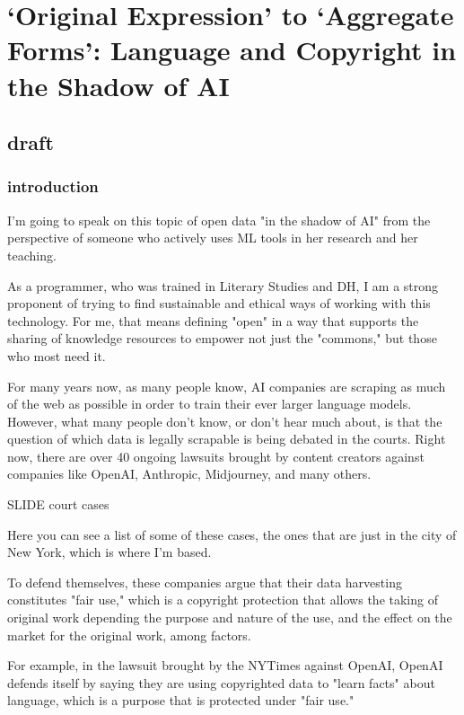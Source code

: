 \documentclass[11pt]{article}
\author{fcalado}
\date{\today}
\title{}
\begin{document}
\tableofcontents

\section{‘Original Expression’ to ‘Aggregate Forms’: Language and Copyright in the Shadow of AI}
\label{sec:org4a910bb}

\subsection{draft}
\label{sec:org3d2ee2e}

\subsubsection{introduction}
\label{sec:org77da725}
I'm going to speak on this topic of open data "in the shadow of AI"
from the perspective of someone who actively uses ML tools in her
research and her teaching.

As a programmer, who was trained in Literary Studies and DH, I am a
strong proponent of trying to find sustainable and ethical ways of
working with this technology. For me, that means defining "open" in a
way that supports the sharing of knowledge resources to empower not
just the "commons," but those who most need it.

For many years now, as many people know, AI companies are scraping as
much of the web as possible in order to train their ever larger
language models. However, what many people don't know, or don't hear
much about, is that the question of which data is legally scrapable is
being debated in the courts. Right now, there are over 40 ongoing
lawsuits brought by content creators against companies like OpenAI,
Anthropic, Midjourney, and many others.

SLIDE court cases

Here you can see a list of some of these cases, the ones that are just
in the city of New York, which is where I'm based.

To defend themselves, these companies argue that their data harvesting
constitutes "fair use," which is a copyright protection that allows
the taking of original work depending the purpose and nature of the
use, and the effect on the market for the original work, among
factors.

For example, in the lawsuit brought by the NYTimes against OpenAI,
OpenAI defends itself by saying they are using copyrighted data to
"learn facts" about language, which is a purpose that is protected
under "fair use."
\end{document}

